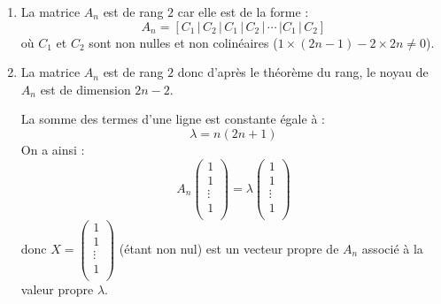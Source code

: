 \documentclass[a4paper,10pt]{report}
\begin{document}
\corr 

\begin{enumerate}
\item La matrice $A_n$ est de rang $2$ car elle est de la forme :
$$A_n =[C_1 \, \vert \, C_2 \, \vert \, C_1 \, \vert \, C_2 \, \vert \, \cdots \, \vert C_1 \, \vert \, C_2]$$
où $C_1$ et $C_2$ sont non nulles et non colinéaires ($1 \times (2n-1)-2\times 2n \neq 0$).
\item La matrice $A_n$ est de rang $2$ donc d'après le théorème du rang, le noyau de $A_n$ est de dimension $2n-2$. 

\medskip

\noindent La somme des termes d'une ligne est constante égale à :
$$ \lambda = n(2n+1)$$
On a ainsi :
$$ A_n \begin{pmatrix}
1 \\
1 \\
\vdots \\
1 \\
\end{pmatrix} = \lambda \begin{pmatrix}
1 \\
1 \\
\vdots \\
1 \\
\end{pmatrix}$$
donc $X = \begin{pmatrix}
1 \\
1 \\
\vdots \\
1 \\
\end{pmatrix}$ (étant non nul) est un vecteur propre de $A_n$ associé à la valeur propre $\lambda$.

\medskip


\end{enumerate}
\end{document}
